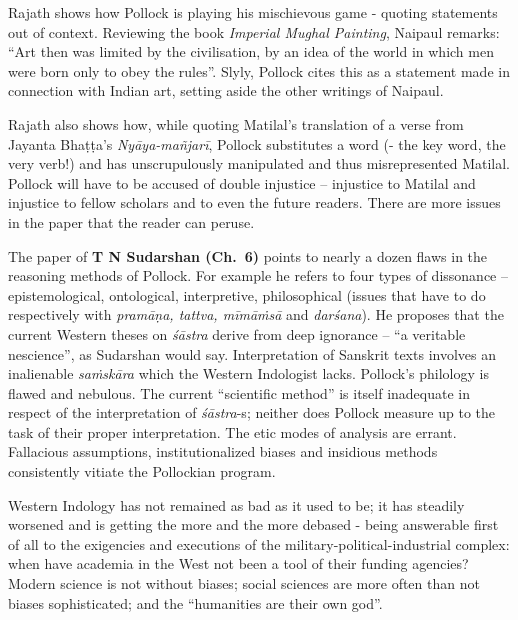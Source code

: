 Rajath shows how Pollock is playing his mischievous game - quoting statements out of context. Reviewing the book {\sl Imperial Mughal Painting}, Naipaul remarks: “Art then was limited by the civilisation, by an idea of the world in which men were born only to obey the rules”. Slyly, Pollock cites this as a statement made in connection with Indian art, setting aside the other writings of Naipaul.

Rajath also shows how, while quoting Matilal’s translation of a verse from Jayanta Bhaṭṭa’s {\sl Nyāya-mañjarī}, Pollock substitutes a word (- the key word, the very verb!) and has unscrupulously manipulated and thus misrepresented Matilal. Pollock will have to be accused of double injustice -- injustice to Matilal and injustice to fellow scholars and to even the future readers. There are more issues in the paper that the reader can peruse.

The paper of {\bf T N Sudarshan (Ch.~6)} points to nearly a dozen flaws in the reasoning methods of Pollock. For example he refers to four types of dissonance -- epistemological, ontological, interpretive, philosophical (issues that have to do respectively with {\sl pramāṇa, tattva, mīmāṁsā} and {\sl darśana}). He proposes that the current Western theses on {\sl śāstra} derive from deep ignorance -- “a veritable nescience”, as Sudarshan would say. Interpretation of Sanskrit texts involves an inalienable {\sl saṁskāra} which the Western Indologist lacks. Pollock’s philology is flawed and nebulous. The current “scientific method” is itself inadequate in respect of the interpretation of {\sl śāstra}-s; neither does Pollock measure up to the task of their proper interpretation. The etic modes of analysis are errant. Fallacious assumptions, institutionalized biases and insidious methods consistently vitiate the Pollockian program.

Western Indology has not remained as bad as it used to be; it has steadily worsened and is getting the more and the more debased - being answerable first of all to the exigencies and executions of the military-political-industrial complex: when have academia in the West not been a tool of their funding agencies? Modern science is not without biases; social sciences are more often than not biases sophisticated; and the “humanities are their own god”.

